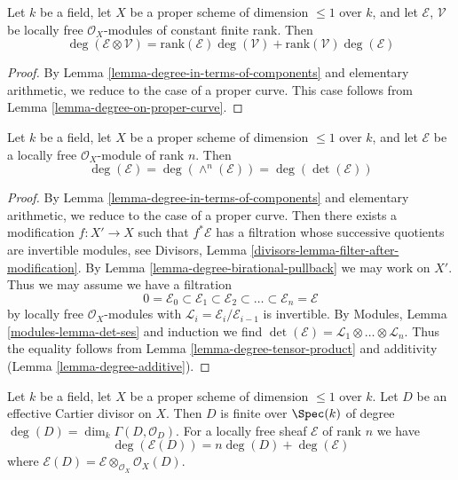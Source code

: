 \begin{lemma}
\label{lemma-degree-tensor-product}
Let $k$ be a field, let $X$ be a proper scheme of dimension $\leq 1$
over $k$, and let $\mathcal{E}$, $\mathcal{V}$ be locally free
$\mathcal{O}_X$-modules of constant finite rank. Then
$$
\deg(\mathcal{E} \otimes \mathcal{V}) =
\text{rank}(\mathcal{E}) \deg(\mathcal{V}) +
\text{rank}(\mathcal{V}) \deg(\mathcal{E})
$$
\end{lemma}

\begin{proof}
By Lemma \ref{lemma-degree-in-terms-of-components} and elementary
arithmetic, we reduce to the case of a proper curve.
This case follows from Lemma \ref{lemma-degree-on-proper-curve}.
\end{proof}

\begin{lemma}
\label{lemma-degree-and-det}
Let $k$ be a field, let $X$ be a proper scheme of dimension $\leq 1$
over $k$, and let $\mathcal{E}$ be a locally free
$\mathcal{O}_X$-module of rank $n$. Then
$$
\deg(\mathcal{E}) = \deg(\wedge^n(\mathcal{E})) = \deg(\det(\mathcal{E}))
$$
\end{lemma}

\begin{proof}
By Lemma \ref{lemma-degree-in-terms-of-components} and elementary
arithmetic, we reduce to the case of a proper curve.
Then there exists a modification $f : X' \to X$ such that
$f^*\mathcal{E}$ has a filtration whose successive
quotients are invertible modules, see
Divisors, Lemma \ref{divisors-lemma-filter-after-modification}.
By Lemma \ref{lemma-degree-birational-pullback} we may work on $X'$.
Thus we may assume we have a filtration
$$
0 = \mathcal{E}_0 \subset \mathcal{E}_1 \subset \mathcal{E}_2 \subset
\ldots \subset \mathcal{E}_n = \mathcal{E}
$$
by locally free $\mathcal{O}_X$-modules
with $\mathcal{L}_i = \mathcal{E}_i/\mathcal{E}_{i - 1}$ is invertible.
By Modules, Lemma \ref{modules-lemma-det-ses} and induction we find
$\det(\mathcal{E}) = \mathcal{L}_1 \otimes \ldots \otimes \mathcal{L}_n$.
Thus the equality follows from Lemma \ref{lemma-degree-tensor-product}
and additivity (Lemma \ref{lemma-degree-additive}).
\end{proof}

\begin{lemma}
\label{lemma-degree-effective-Cartier-divisor}
Let $k$ be a field, let $X$ be a proper scheme of dimension $\leq 1$
over $k$. Let $D$ be an effective Cartier divisor on $X$.
Then $D$ is finite over $\Spec(k)$ of degree
$\deg(D) = \dim_k \Gamma(D, \mathcal{O}_D)$. For a locally free sheaf
$\mathcal{E}$ of rank $n$ we have
$$
\deg(\mathcal{E}(D)) = n\deg(D) + \deg(\mathcal{E})
$$
where $\mathcal{E}(D) = \mathcal{E} \otimes_{\mathcal{O}_X} \mathcal{O}_X(D)$.
\end{lemma}

